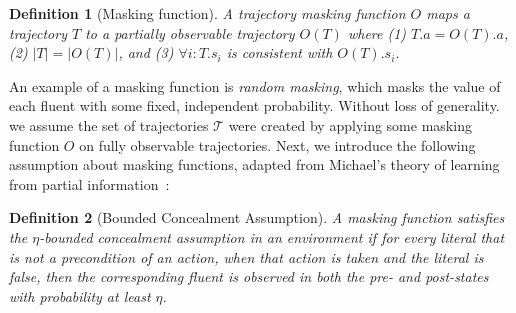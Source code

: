 \documentclass[letterpaper]{article} %
\newcommand{\roni}[1]{ }
\newtheorem{definition}{Definition}
\begin{document}


\begin{definition}[Masking function]
A trajectory {masking function} $O$ maps a trajectory $T$ to a partially observable trajectory $O(T)$ where
(1) $T.a=O(T).a$,
(2) $|T|=|O(T)|$,
and (3) $\forall i: T.s_i$ is consistent with $O(T).s_i$.
\end{definition}
An example of a masking function is \emph{random masking}, which masks the value of each fluent with some fixed, independent probability.
Without loss of generality. we assume the set of trajectories $\mathcal{T}$ were created by applying some masking function $O$ on fully observable trajectories.
Next, we introduce the following assumption about masking functions, adapted from Michael's theory of learning from partial information~\cite{michael2010partialObservability}:
\begin{definition}[Bounded Concealment Assumption]
A masking function satisfies the {\em $\eta$-bounded concealment assumption} in an environment if for every literal that is not a precondition of an action, when that action is taken and the literal is false, then the corresponding fluent is observed in both the pre- and post-states with probability at least $\eta$.

\end{definition}
\end{document}
